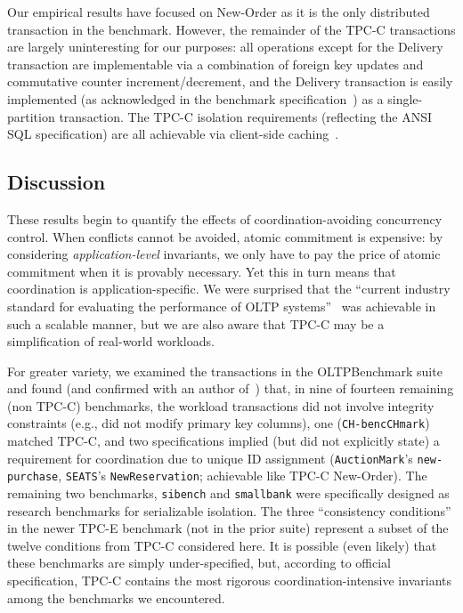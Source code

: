  Our empirical results have focused
on New-Order as it is the only distributed transaction in the
benchmark. However, the remainder of the TPC-C transactions are
largely uninteresting for our purposes: all operations except for the
Delivery transaction are implementable via a combination of foreign
key updates and commutative counter increment/decrement, and the
Delivery transaction is easily implemented (as acknowledged in the
benchmark specification~\cite{tpcc}) as a single-partition
transaction. The TPC-C isolation requirements (reflecting the ANSI SQL
specification) are all achievable via client-side
caching~\cite{hat-vldb}.

\subsection{Discussion}

These results begin to quantify the effects of coordination-avoiding
concurrency control. When conflicts cannot be avoided, atomic
commitment is expensive: by considering \textit{application-level}
invariants, we only have to pay the price of atomic commitment when it
is provably necessary. Yet this in turn means that coordination is
application-specific. We were surprised that the ``current industry
standard for evaluating the performance of OLTP
systems''~\cite{oltpbench} was achievable in such a scalable manner,
but we are also aware that TPC-C may be a simplification of real-world
workloads.

For greater variety, we examined the transactions in the OLTPBenchmark
suite~\cite{oltpbench} and found (and confirmed with an author
of~\cite{oltpbench}) that, in nine of fourteen remaining (non TPC-C)
benchmarks, the workload transactions did not involve integrity
constraints (e.g., did not modify primary key columns), one
(\texttt{CH-bencCHmark}) matched TPC-C, and two specifications implied
(but did not explicitly state) a requirement for coordination due to
unique ID assignment (\texttt{AuctionMark}'s \texttt{new-purchase},
\texttt{SEATS}'s \texttt{NewReservation}; achievable like TPC-C
New-Order). The remaining two benchmarks, \texttt{sibench} and
\texttt{smallbank} were specifically designed as research benchmarks
for serializable isolation. The three ``consistency conditions'' in
the newer TPC-E benchmark (not in the prior suite) represent a subset
of the twelve conditions from TPC-C considered here. It is possible
(even likely) that these benchmarks are simply under-specified, but,
according to official specification, TPC-C contains the most rigorous
coordination-intensive invariants among the benchmarks we encountered.

